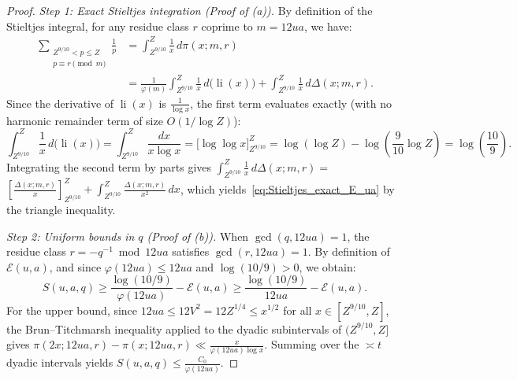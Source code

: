 \documentclass[11pt, a4paper]{article}
\theoremstyle{plain}
\theoremstyle{definition}
\begin{document}
\begin{proof}
\emph{Step 1: Exact Stieltjes integration (Proof of (a)).}
By definition of the Stieltjes integral, for any residue class $r$ coprime to $m = 12ua$, we have:
\[
\begin{aligned}
\sum_{\substack{Z^{9/10} < p \le Z \\ p \equiv r \pmod m}} \frac{1}{p} &= \int_{Z^{9/10}}^Z \frac{1}{x}\,d\pi(x; m, r) \\
&= \frac{1}{\varphi(m)} \int_{Z^{9/10}}^Z \frac{1}{x}\,d\big(\operatorname{li}(x)\big) + \int_{Z^{9/10}}^Z \frac{1}{x}\,d\Delta(x; m, r).
\end{aligned}
\]
Since the derivative of $\operatorname{li}(x)$ is $\frac{1}{\log x}$, the first term evaluates exactly (with no harmonic remainder term of size $O(1/\log Z)$):
\[
\int_{Z^{9/10}}^Z \frac{1}{x}\,d\big(\operatorname{li}(x)\big) = \int_{Z^{9/10}}^Z \frac{dx}{x \log x} = \big[\log\log x\big]_{Z^{9/10}}^Z = \log(\log Z) - \log\!\left(\frac{9}{10}\log Z\right) = \log\!\left(\frac{10}{9}\right).
\]
Integrating the second term by parts gives $\int_{Z^{9/10}}^Z \frac{1}{x}\,d\Delta(x; m, r) =$\linebreak $\left[\frac{\Delta(x; m, r)}{x}\right]_{Z^{9/10}}^Z + \int_{Z^{9/10}}^Z \frac{\Delta(x; m, r)}{x^2}\,dx$, which yields~\eqref{eq:Stieltjes_exact_E_ua} by the triangle inequality.

\medskip\noindent\emph{Step 2: Uniform bounds in $q$ (Proof of (b)).}
When $\gcd(q, 12ua) = 1$, the residue class $r = -q^{-1} \bmod{12ua}$ satisfies $\gcd(r, 12ua) = 1$. By definition of $\mathcal{E}(u,a)$, and since $\varphi(12ua) \le 12ua$ and $\log(10/9) > 0$, we obtain:
\[
S(u,a,q) \ge \frac{\log(10/9)}{\varphi(12ua)} - \mathcal{E}(u,a) \ge \frac{\log(10/9)}{12ua} - \mathcal{E}(u,a).
\]
For the upper bound, since $12ua \le 12V^2 = 12Z^{1/4} \le x^{1/2}$ for all $x \in [Z^{9/10}, Z]$, the Brun--Titchmarsh inequality applied to the dyadic subintervals of $(Z^{9/10}, Z]$ gives $\pi(2x; 12ua, r) - \pi(x; 12ua, r) \ll \frac{x}{\varphi(12ua)\log x}$. Summing over the $\asymp t$ dyadic intervals yields $S(u,a,q) \le \frac{C_0}{\varphi(12ua)}$.
\end{proof}
\end{document}
